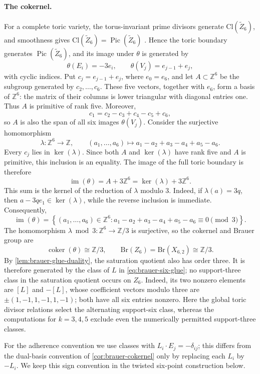 \documentclass[11pt]{article}
\theoremstyle{plain}
\theoremstyle{definition}
\theoremstyle{remark}
\newcommand{\Z}{\mathbb Z}
\newcommand{\Pic}{\operatorname{Pic}}
\newcommand{\Cl}{\mathrm{Cl}}
\newcommand{\Br}{\mathrm{Br}}
\begin{document}
\paragraph{The cokernel.}
For a complete toric variety, the torus-invariant prime divisors generate
\(\Cl(\widetilde Z_6)\), and smoothness gives
\(\Cl(\widetilde Z_6)=\Pic(\widetilde Z_6)\)
\cite[Theorem~4.1.3]{CoxLittleSchenck2011}. Hence the toric boundary generates
\(\Pic(\widetilde Z_6)\), and its image under \(\theta\) is generated by
\[
\theta(E_i)=-3e_i,
\qquad
\theta(V_j)=e_{j-1}+e_j,
\]
with cyclic indices. Put \(c_j=e_{j-1}+e_j\), where \(e_0=e_6\), and let
\(A\subset\Z^6\) be the subgroup generated by \(c_2,\dots,c_6\).
These five vectors, together with \(e_6\), form a basis of \(\Z^6\):
the matrix of their columns is lower triangular with diagonal entries one.
Thus \(A\) is primitive of rank five. Moreover,
\[
c_1=c_2-c_3+c_4-c_5+c_6,
\]
so \(A\) is also the span of all six images \(\theta(V_j)\). Consider the
surjective homomorphism
\[
\lambda:\Z^6\longrightarrow\Z,
\qquad
(a_1,\dots,a_6)\longmapsto
a_1-a_2+a_3-a_4+a_5-a_6.
\]
Every \(c_j\) lies in \(\ker(\lambda)\). Since both
\(A\) and \(\ker(\lambda)\) have rank five and \(A\) is primitive,
this inclusion is an equality. The image of the full toric boundary is
therefore
\[
\operatorname{im}(\theta)
=
A+3\Z^6
=
\ker(\lambda)+3\Z^6.
\]
This sum is the kernel of the reduction of \(\lambda\) modulo \(3\). Indeed,
if \(\lambda(a)=3q\), then \(a-3q e_1\in\ker(\lambda)\), while the reverse
inclusion is immediate. Consequently,
\[
\operatorname{im}(\theta)
=
\left\{
(a_1,\dots,a_6)\in\Z^6:
a_1-a_2+a_3-a_4+a_5-a_6\equiv0\pmod3
\right\}.
\]
The homomorphism \(\lambda\bmod3:\Z^6\to\Z/3\) is surjective, so the
cokernel and Brauer group are
\[
\operatorname{coker}(\theta)\cong\Z/3,
\qquad
\Br(Z_6)=\Br(X_{6,2})\cong\Z/3.
\]
By \cref{lem:brauer-glue-duality}, the saturation quotient also has order three.
It is therefore generated by the class of \(L\) in
\eqref{eq:brauer-six-glue}; no support-three class in the saturation quotient occurs on \(Z_6\).
Indeed, its two nonzero elements are \([L]\) and \(-[L]\), whose
coefficient vectors modulo three are
\(\pm(1,-1,1,-1,1,-1)\); both have all six entries nonzero.
Here the global toric divisor relations select the alternating
support-six class, whereas the computations for \(k=3,4,5\) exclude
even the numerically permitted support-three classes.

For the adherence convention we use classes with
\(L_i\cdot E_j=-\delta_{ij}\); this differs from the dual-basis convention
of \cref{cor:brauer-cokernel} only by replacing each \(L_i\) by \(-L_i\).
We keep this sign convention in the twisted six-point construction below.
\end{document}
